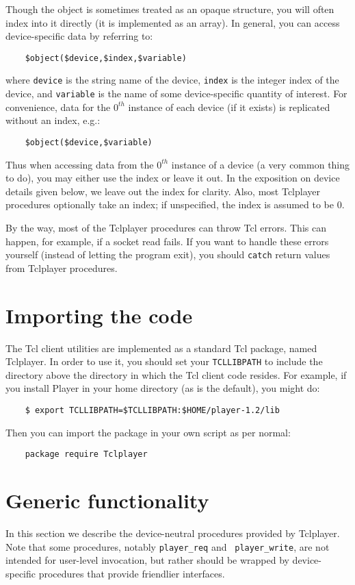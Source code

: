 \documentclass[11pt]{article}
\begin{document}
Though the object is sometimes treated as an opaque structure, you will
often index into it directly (it is implemented as an array).  In general, you
can access device-specific data by referring to:
\begin{verbatim}
    $object($device,$index,$variable)
\end{verbatim}
where {\tt device} is the string name of the device, {\tt index} is the integer
index of the device, and {\tt variable} is the name of some device-specific
quantity of interest.  For convenience, data for the $0^{th}$ instance of 
each device (if it exists) is replicated without an index, e.g.:
\begin{verbatim}
    $object($device,$variable)
\end{verbatim}
Thus when accessing data from the $0^{th}$ instance of a device (a very
common thing to do), you may either use the index or leave it out.  In the
exposition on device details given below, we leave out the index for clarity.
Also, most Tclplayer procedures optionally take an index; if unspecified, the
index is assumed to be 0.

By the way, most of the Tclplayer procedures can throw Tcl errors.  This can
happen, for example, if a socket read fails.  If you want to handle these
errors yourself (instead of letting the program exit), you should {\tt catch} 
return values from Tclplayer procedures.

\section{Importing the code}
The Tcl client utilities are implemented as a standard Tcl package, named
Tclplayer.  In order to use it, you should set your {\tt TCLLIBPATH}
to include the directory above the directory in which the Tcl client code
resides.  For example, if you install Player in your home directory (as is
the default), you might do:
\begin{verbatim}
    $ export TCLLIBPATH=$TCLLIBPATH:$HOME/player-1.2/lib
\end{verbatim}
Then you can import the package in your own script as per normal:
\begin{verbatim}
    package require Tclplayer
\end{verbatim}

\section{Generic functionality}
In this section we describe the device-neutral procedures provided by
Tclplayer.  Note that some procedures, notably {\tt player\_req} and {\tt
player\_write}, are not intended for user-level invocation, but rather should
be wrapped by device-specific procedures that provide friendlier interfaces.
\end{document}
